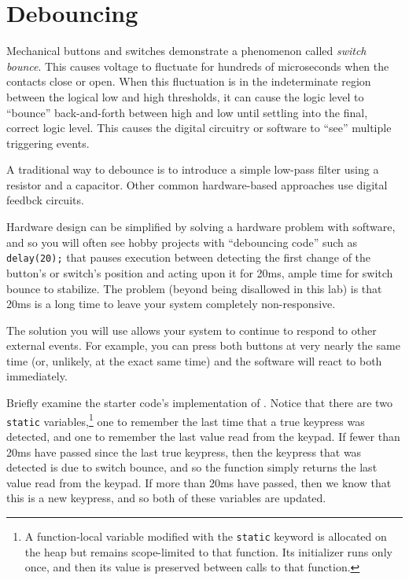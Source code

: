 \section{Debouncing} \label{sec:debouncing}

Mechanical buttons and switches demonstrate a phenomenon called \textit{switch bounce}.
This causes voltage to fluctuate for hundreds of microseconds when the contacts close or open.
When this fluctuation is in the indeterminate region between the logical low and high thresholds, it can cause the logic level to ``bounce'' back-and-forth between high and low until settling into the final, correct logic level.
This causes the digital circuitry or software to ``see'' multiple triggering events.

A traditional way to debounce is to introduce a simple low-pass filter using a resistor and a capacitor.
Other common hardware-based approaches use digital feedbck circuits.

Hardware design can be simplified by solving a hardware problem with software, and so you will often see hobby projects with ``debouncing code'' such as \lstinline{delay(20);} that pauses execution between detecting the first change of the button's or switch's position and acting upon it for 20ms, ample time for switch bounce to stabilize. The problem (beyond  being disallowed in this lab) is that 20ms is a long time to leave your system completely non-responsive.

The solution you will use allows your system to continue to respond to other external events. For example, you can press both buttons at very nearly the same time (or, unlikely, at the exact same time) and the software will react to both immediately.

Briefly examine the starter code's implementation of .
Notice that there are two \lstinline{static} variables,\footnote{
A function-local variable modified with the \lstinline{static} keyword is allocated on the heap but remains scope-limited to that function.
Its initializer runs only once, and then its value is preserved between calls to that function.}
one to remember the last time that a true keypress was detected, and one to remember the last value read from the keypad.
If fewer than 20ms have passed since the last true keypress, then the keypress that was detected is due to switch bounce, and so the function simply returns the last value read from the keypad.
If more than 20ms have passed, then we know that this is a new keypress, and so both of these variables are updated.

